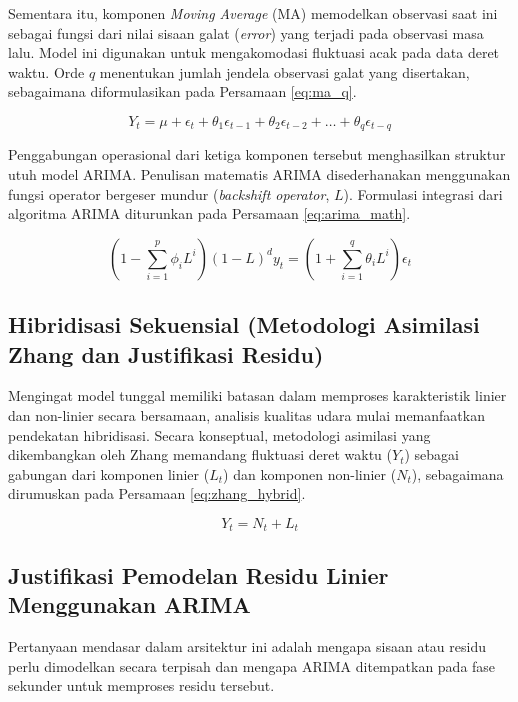 Sementara itu, komponen \textit{Moving Average} (MA) memodelkan observasi saat ini sebagai fungsi dari nilai sisaan galat (\textit{error}) yang terjadi pada observasi masa lalu. Model ini digunakan untuk mengakomodasi fluktuasi acak pada data deret waktu. Orde $q$ menentukan jumlah jendela observasi galat yang disertakan, sebagaimana diformulasikan pada Persamaan \ref{eq:ma_q}.

\begin{equation}
Y_t = \mu + \epsilon_t + \theta_1 \epsilon_{t-1} + \theta_2 \epsilon_{t-2} + \dots + \theta_q \epsilon_{t-q}
\label{eq:ma_q}
\end{equation}

Penggabungan operasional dari ketiga komponen tersebut menghasilkan struktur utuh model ARIMA. Penulisan matematis ARIMA disederhanakan menggunakan fungsi operator bergeser mundur (\textit{backshift operator}, $L$). Formulasi integrasi dari algoritma ARIMA diturunkan pada Persamaan \ref{eq:arima_math}.

\begin{equation}
\left( 1 - \sum_{i=1}^p \phi_i L^i \right) (1-L)^d y_t = \left( 1 + \sum_{i=1}^q \theta_i L^i \right) \epsilon_t
\label{eq:arima_math}
\end{equation}

\subsection{Hibridisasi Sekuensial (Metodologi Asimilasi Zhang dan Justifikasi Residu)}

Mengingat model tunggal memiliki batasan dalam memproses karakteristik linier dan non-linier secara bersamaan, analisis kualitas udara mulai memanfaatkan pendekatan hibridisasi. Secara konseptual, metodologi asimilasi yang dikembangkan oleh Zhang memandang fluktuasi deret waktu ($Y_t$) sebagai gabungan dari komponen linier ($L_t$) dan komponen non-linier ($N_t$), sebagaimana dirumuskan pada Persamaan \ref{eq:zhang_hybrid}.

\begin{equation}
Y_t = N_t + L_t
\label{eq:zhang_hybrid}
\end{equation}

\subsection{Justifikasi Pemodelan Residu Linier Menggunakan ARIMA}
Pertanyaan mendasar dalam arsitektur ini adalah mengapa sisaan atau residu perlu dimodelkan secara terpisah dan mengapa ARIMA ditempatkan pada fase sekunder untuk memproses residu tersebut. 

